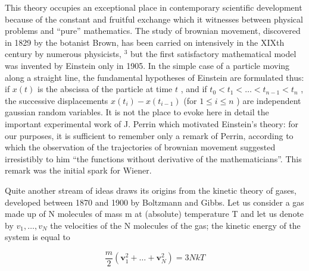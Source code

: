 This theory occupies an exceptional place in contemporary scientific development because of the constant and fruitful exchange which it witnesses between physical problems and ``pure'' mathematics. The study of brownian movement, discovered in 1829 by the botanist Brown, has been carried on intensively in the XIXth century by numerous physicists, \(^{3}\) but the first satisfactory mathematical model was invented by Einstein only in 1905. In the simple case of a particle moving along a straight line, the fundamental hypotheses of Einstein are formulated thus: if \(x(t)\) is the abscissa of the particle at time \(t\) , and if \(t_0 < t_1 < \ldots < t_{n-1} < t_n\) , the successive displacements \(x(t_i) - x(t_{i-1})\) (for \(1 \leq i \leq n\) ) are independent gaussian random variables. It is not the place to evoke here in detail the important experimental work of J. Perrin which motivated Einstein's theory: for our purposes, it is sufficient to remember only a remark of Perrin, according to which the observation of the trajectories of brownian movement suggested irresistibly to him ``the functions without derivative of the mathematicians''. This remark was the initial spark for Wiener.

Quite another stream of ideas draws its origins from the kinetic theory of gases, developed between 1870 and 1900 by Boltzmann and Gibbs. Let us consider a gas made up of N molecules of mass m at (absolute) temperature T and let us denote by \(v_{1}, \ldots, v_{N}\) the velocities of the N molecules of the gas; the kinetic energy of the system is equal to

\[
\frac {m}{2} (\mathbf {v} _ {1} ^ {2} + \dots + \mathbf {v} _ {N} ^ {2}) = 3 N k T\tag{24.1}
\]

